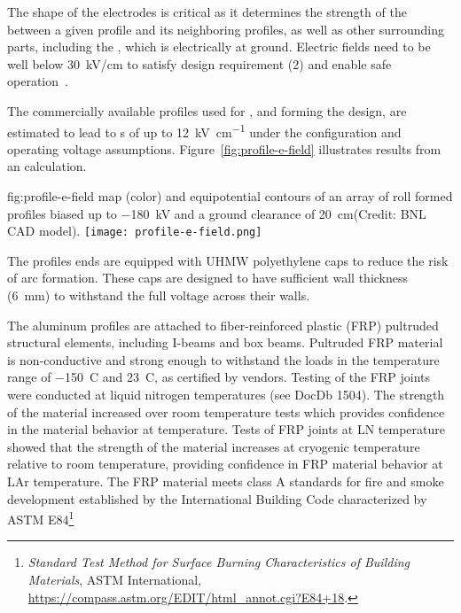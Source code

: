 The shape of the electrodes is critical as it determines the strength of the \efield{} between a given profile and its neighboring profiles, as well as
other surrounding parts, including the , which is electrically at ground. %
Electric fields need to be well below \SI{30}{\kilo\volt/\centi\meter} 
to satisfy design requirement (2) and enable safe  operation~\cite{Blatter:2014wua}. %

The commercially available profiles used for , and forming the  design, are estimated to lead to \efield{}s of up to \SI{12}{\kilo\volt\per\centi\meter} under the %
configuration and operating voltage assumptions.
Figure~\ref{fig:profile-e-field} illustrates results from an \efield{} calculation.
\begin{dunefigure}
{fig:profile-e-field}
{\efield map (color) and equipotential contours of an array of roll formed profiles biased up to \SI{-180}{\kV} and a ground clearance of \SI{20}{\cm}(Credit: BNL CAD model).} \texttt{[image: profile-e-field.png]}
\end{dunefigure}

The profiles ends are equipped with UHMW polyethylene caps to reduce the risk of arc formation.  These caps are designed to have sufficient wall thickness (\SI{6}{\milli\m}) to withstand the full voltage across their walls.

The aluminum profiles are attached to fiber-reinforced plastic (FRP) pultruded structural elements, including I-beams and box beams.  
Pultruded FRP material is non-conductive and strong enough to withstand the  loads  in the temperature range of \SI{-150}{C} and \SI{23}{C}, as certified by vendors. Testing of the FRP joints were conducted at liquid nitrogen temperatures (see DocDb 1504).  The strength of the material increased over room temperature tests which provides confidence in the material behavior at \lar  temperature. Tests of FRP joints at LN temperature showed that the strength of the material increases at cryogenic temperature relative to room temperature, providing confidence in FRP material behavior at LAr temperature.
The FRP material meets class A standards for fire and smoke development established by the International Building Code characterized by ASTM E84\footnote{\textit{Standard Test Method for Surface Burning Characteristics of Building Materials}, ASTM International, \url{https://compass.astm.org/EDIT/html_annot.cgi?E84+18}.}

